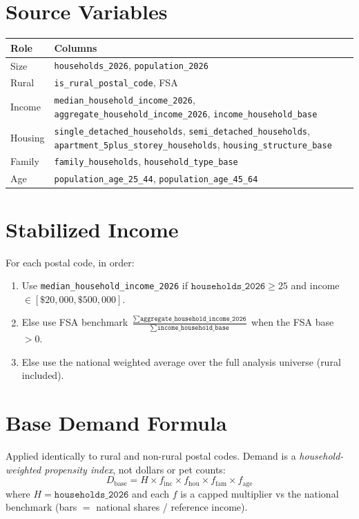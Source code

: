 \documentclass[10pt]{article}
\begin{document}
\section{Source Variables}
\begin{center}
\small
\begin{tabular}{@{}ll@{}}
\toprule
Role & Columns \\
\midrule
Size & \texttt{households\_2026}, \texttt{population\_2026} \\
Rural & \texttt{is\_rural\_postal\_code}, FSA \\
Income & \texttt{median\_household\_income\_2026}, \texttt{aggregate\_household\_income\_2026}, \texttt{income\_household\_base} \\
Housing & \texttt{single\_detached\_households}, \texttt{semi\_detached\_households}, \texttt{apartment\_5plus\_storey\_households}, \texttt{housing\_structure\_base} \\
Family & \texttt{family\_households}, \texttt{household\_type\_base} \\
Age & \texttt{population\_age\_25\_44}, \texttt{population\_age\_45\_64} \\
\bottomrule
\end{tabular}
\end{center}

\section{Stabilized Income}
For each postal code, in order:
\begin{enumerate}
  \item Use \texttt{median\_household\_income\_2026} if $\texttt{households\_2026}\ge 25$ and income $\in[\$20{,}000,\$500{,}000]$.
  \item Else use FSA benchmark $\displaystyle\frac{\sum \texttt{aggregate\_household\_income\_2026}}{\sum \texttt{income\_household\_base}}$ when the FSA base $>0$.
  \item Else use the national weighted average over the full analysis universe (rural included).
\end{enumerate}

\section{Base Demand Formula}
Applied identically to rural and non-rural postal codes. Demand is a
\emph{household-weighted propensity index}, not dollars or pet counts:
\[
D_{\text{base}}
=
H
\times f_{\text{inc}}
\times f_{\text{hou}}
\times f_{\text{fam}}
\times f_{\text{age}}
\]
where $H=\texttt{households\_2026}$ and each $f$ is a capped multiplier vs the national benchmark (bars $=$ national shares / reference income).
\end{document}
